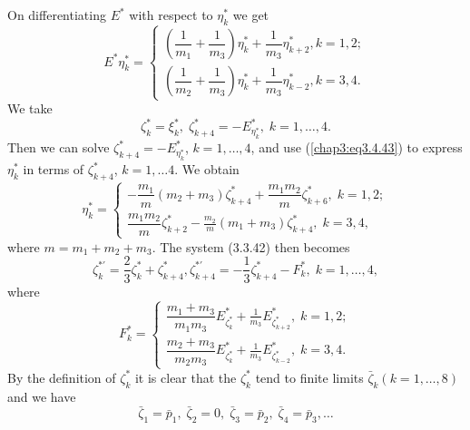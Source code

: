 On differentiating $E^*$ with respect to $\eta^*_k$ we get
\begin{equation*}
E^* \eta^*_k = 
\begin{cases}
\left(\dfrac{1}{m_1} + \dfrac{1}{m_3} \right) \eta^*_k +
\dfrac{1}{m_3} \eta^*_{k+2} , k =1,2; \\[6pt] 
\left(\dfrac{1}{m_2} + \dfrac{1}{m_3} \right) \eta^*_{k} +
\dfrac{1}{m_3} \eta^*_{k-2} , k =3,4.  
\end{cases}
\tag{3.4.43}\label{chap3:eq3.4.43}
\end{equation*}
We take 
\begin{equation*}
\zeta^*_k = \xi^*_k , \; \zeta^*_{k+4} = - E^*_{\eta^*_k}, \; k =1, \ldots, 4. 
\tag{3.4.44}\label{chap3:eq3.4.44}
\end{equation*}
Then we can solve $\zeta^*_{k+4} = - E^*_{\eta^*_k}$, $k = 1, \ldots,
4$, and use (\ref{chap3:eq3.4.43}) to express $\eta^*_k$ in terms of
$\zeta^*_{k+4}$, $k =1, \ldots 4$. We obtain 
\begin{equation*}
\eta^*_k =
\begin{cases}
-\dfrac{m_1}{m} (m_2 + m_3) \zeta^*_{k+4} + \dfrac{m_1 m_2}{m}
\zeta^*_{k+6}, \; k = 1,2; \\[6pt] 
\dfrac{m_1 m_2}{m} \zeta^*_{k+2} -\frac{m_2}{m} (m_1 + m_3)
\zeta^*_{k+4} , \; k =
3,4, \end{cases}\tag{3.4.45}\label{chap3:eq3.4.45} 
\end{equation*}\pageoriginale
where $m= m_1 + m_2 + m_3$. The system (3.3.42) then becomes
\begin{equation*}
\zeta^{*'}_k = \frac{2}{3} \zeta^*_k + \zeta^*_{k+4} ,
\zeta^{*'}_{k+4} = - \frac{1}{3} \zeta^*_{k+4} - F^*_k, \;k = 1,
\ldots, 4,\tag{3.4.46}\label{chap3:eq3.4.46} 
\end{equation*}
where
\begin{equation*}
F^*_k = 
\begin{cases}
\dfrac{m_1 + m_3}{m_1 m_3} E^*_{\zeta^*_k} + \frac{1}{m_3}
E^*_{\zeta^*_{k+2}}, \; k =1,2; \\[6pt] 
\dfrac{m_2 + m_3}{m_2 m_3} E^*_{\zeta^*_k} + \frac{1}{m_3}
E^*_{\zeta^*_{k-2}}, \; k =3,4. 
\end{cases}
\tag{3.4.47}\label{chap3:eq3.4.47}
\end{equation*}
By the definition of $\zeta^*_k$ it is clear that the $\zeta^*_k$ tend
to finite limits $\bar{\zeta}_k (k= 1, \ldots, 8)$ and we have  
\begin{equation*}
\bar{\zeta}_1 = \bar{p}_1, \; \bar{\zeta}_2 = 0, \;\bar{\zeta}_3 =
\bar{p}_2 , \; \bar{\zeta}_4 = \bar{p}_3 , \ldots
\tag{3.4.48}\label{chap3:eq3.4.48} 
\end{equation*}
